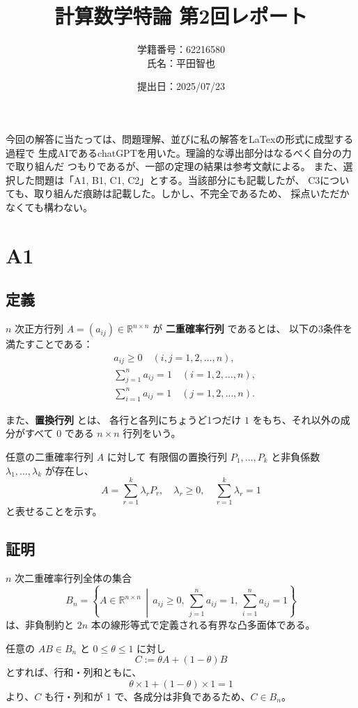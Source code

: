 \documentclass[a4paper]{ltjsarticle}
\title{計算数学特論 第2回レポート}
\author{学籍番号：62216580\\氏名：平田智也}
\date{提出日：2025/07/23}
\begin{document}
\maketitle

今回の解答に当たっては、問題理解、並びに私の解答をLaTexの形式に成型する過程で
生成AIであるchatGPTを用いた。理論的な導出部分はなるべく自分の力で取り組んだ
つもりであるが、一部の定理の結果は参考文献による。
また、選択した問題は「A1, B1, C1, C2」とする。当該部分にも記載したが、
C3についても、取り組んだ痕跡は記載した。しかし、不完全であるため、
採点いただかなくても構わない。

\section*{A1}

\subsection*{定義}
$n$ 次正方行列 $A = (a_{ij}) \in \mathbb{R}^{n \times n}$ が
\textbf{二重確率行列} であるとは、
以下の3条件を満たすことである：
\begin{align}
  & a_{ij} \ge 0 \quad (i,j = 1,2,\dots,n), \\
  & \sum_{j=1}^n a_{ij} = 1 \quad (i = 1,2,\dots,n), \\
  & \sum_{i=1}^n a_{ij} = 1 \quad (j = 1,2,\dots,n).
\end{align}

また、\textbf{置換行列} とは、
各行と各列にちょうど1つだけ $1$ をもち、それ以外の成分がすべて $0$ である
$n \times n$ 行列をいう。

\medskip
任意の二重確率行列 $A$ に対して
有限個の置換行列 $P_1,\dots,P_k$ と非負係数 $\lambda_1,\dots,\lambda_k$ が存在し、
\[
  A = \sum_{r=1}^k \lambda_r P_r, \quad \lambda_r \ge 0, \quad \sum_{r=1}^k \lambda_r = 1
\]
と表せることを示す。

\subsection*{証明}
$n$ 次二重確率行列全体の集合
   \[
     B_n = \left\{
       A \in \mathbb{R}^{n \times n} \,\middle|\,
       a_{ij} \ge 0,\,
       \sum_{j=1}^n a_{ij} = 1,\,
       \sum_{i=1}^n a_{ij} = 1
     \right\}
   \]
   は、非負制約と $2n$ 本の線形等式で定義される有界な凸多面体である。

任意の $A B \in B_n$ と $0 \le \theta \le 1$ に対し
\[
	C := \theta A + (1-\theta) B
\]
とすれば、行和・列和ともに、
\[
\theta \times 1 + (1-\theta) \times 1 = 1
\]
より、$C$ も行・列和が 1 で、各成分は非負であるため、$C \in B_n$。
\end{document}
